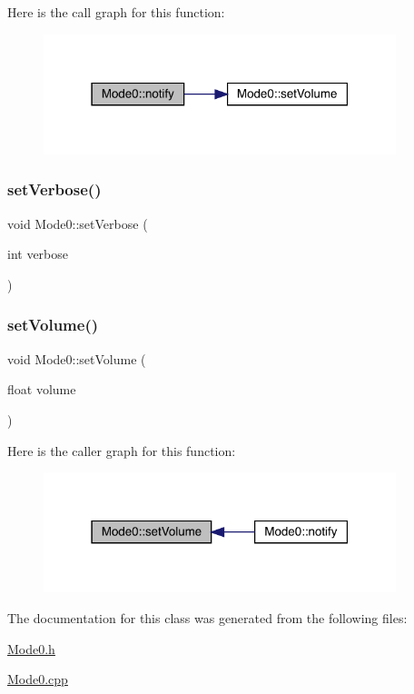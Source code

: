 Here is the call graph for this function\+:\nopagebreak
\begin{figure}[H]
\begin{center}
\leavevmode
\includegraphics[width=291pt]{class_mode0_a743ebe3d0faccc421d06c9114026a099_cgraph}
\end{center}
\end{figure}
\mbox{\label{class_mode0_af3ee35f532b8110005163207671ece18}} 
\subsubsection{\texorpdfstring{set\+Verbose()}{setVerbose()}}
{\footnotesize\ttfamily void Mode0\+::set\+Verbose (\begin{DoxyParamCaption}\item[{int}]{verbose }\end{DoxyParamCaption})}

\mbox{\label{class_mode0_ae7c9f24425bf7947b56d9061b353393c}} 
\subsubsection{\texorpdfstring{set\+Volume()}{setVolume()}}
{\footnotesize\ttfamily void Mode0\+::set\+Volume (\begin{DoxyParamCaption}\item[{float}]{volume }\end{DoxyParamCaption})}

Here is the caller graph for this function\+:\nopagebreak
\begin{figure}[H]
\begin{center}
\leavevmode
\includegraphics[width=291pt]{class_mode0_ae7c9f24425bf7947b56d9061b353393c_icgraph}
\end{center}
\end{figure}


The documentation for this class was generated from the following files\+:\begin{DoxyCompactItemize}
\item 
\mbox{\hyperlink{_mode0_8h}{Mode0.\+h}}\item 
\mbox{\hyperlink{_mode0_8cpp}{Mode0.\+cpp}}\end{DoxyCompactItemize}
